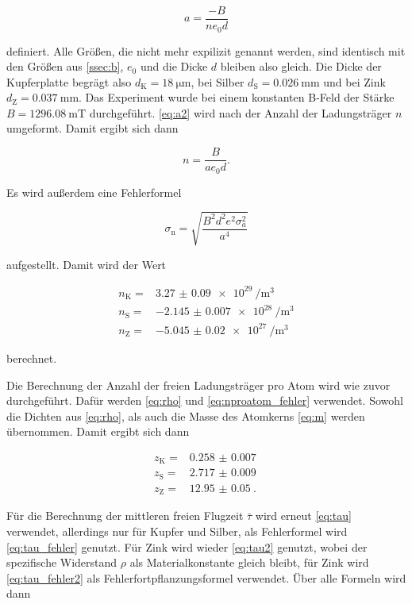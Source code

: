 \begin{equation}
    a = \frac{-B}{n e_0 d}
    \label{eq:a2}
\end{equation}

definiert.
Alle Größen, die nicht mehr expilizit genannt werden, sind identisch mit den Größen aus \autoref{ssec:b}, $e_0$ und die Dicke $d$ bleiben also gleich.
Die Dicke der Kupferplatte begrägt also $d_\text{K} = \SI{18}{\micro\meter}$, bei Silber $d_\text{S} = \SI{0.026}{\milli\meter}$ und bei Zink $d_\text{Z} = \SI{0.037}{\milli\meter}$.
Das Experiment wurde bei einem konstanten B-Feld der Stärke $B = \SI{1296.08}{\milli\tesla}$ durchgeführt.
\autoref{eq:a2} wird nach der Anzahl der Ladungsträger $n$ umgeformt.
Damit ergibt sich dann

\begin{equation}
    n = \frac{B}{a e_0 d}.
    \label{eq:n2}
\end{equation}

Es wird außerdem eine Fehlerformel 

\begin{equation}
    \sigma _\text{n} = \sqrt{\frac {B^{2} d^{2} e^{2} \sigma_{a}^{2} }{a^{4}}}
    \label{eq:n2_fehler}
\end{equation}

aufgestellt.
Damit wird der Wert

\begin{align*}
    n_\text{K} =& \SI{3.27(9)e29}{\per\cubic\meter}\\
    n_\text{S} =& \SI{-2.145(7)e28}{\per\cubic\meter}\\
    n_\text{Z} =& \SI{-5.045(20)e27}{\per\cubic\meter}
\end{align*}

berechnet.

Die Berechnung der Anzahl der freien Ladungsträger pro Atom wird wie zuvor durchgeführt.
Dafür werden \autoref{eq:rho} und \autoref{eq:nproatom_fehler} verwendet.
Sowohl die Dichten aus \autoref{eq:rho}, als auch die Masse des Atomkerns \autoref{eq:m} werden übernommen.
Damit ergibt sich dann 

\begin{align*}
    z_\text{K} =& \SI{0.258(7)}{} \\
    z_\text{S} =& \SI{2.717(9)}{} \\
    z_\text{Z} =& \SI{12.95(5)}{}.
\end{align*}

Für die Berechnung der mittleren freien Flugzeit $\bar{\tau}$ wird erneut \autoref{eq:tau} verwendet, allerdings nur für Kupfer und Silber, als Fehlerformel wird \autoref{eq:tau_fehler} genutzt.
Für Zink wird wieder \autoref{eq:tau2} genutzt, wobei der spezifische Widerstand $\rho$ als Materialkonstante gleich bleibt, für Zink wird \autoref{eq:tau_fehler2} als Fehlerfortpflanzungsformel verwendet.
Über alle Formeln wird dann 

